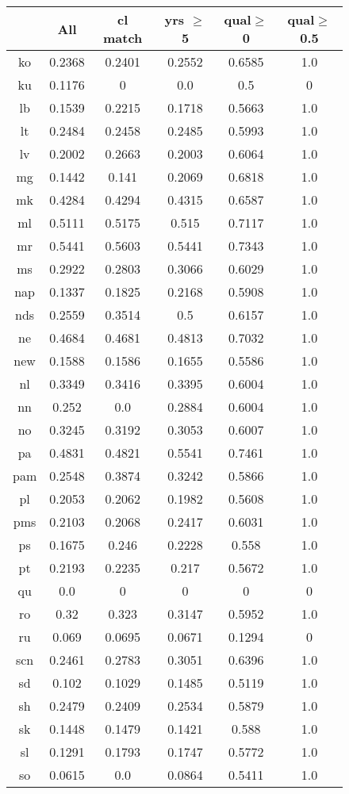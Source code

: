 \begin{figure}[h]
\centering
\begin{tabular}{cccccc}
&All&cl match&yrs $\geq$ 5&qual$\geq$0&qual$\geq$0.5\\
\hline\hline
ko&0.2368&0.2401&0.2552&0.6585&1.0\\
ku&0.1176&0&0.0&0.5&0\\
lb&0.1539&0.2215&0.1718&0.5663&1.0\\
lt&0.2484&0.2458&0.2485&0.5993&1.0\\
lv&0.2002&0.2663&0.2003&0.6064&1.0\\
mg&0.1442&0.141&0.2069&0.6818&1.0\\
mk&0.4284&0.4294&0.4315&0.6587&1.0\\
ml&0.5111&0.5175&0.515&0.7117&1.0\\
mr&0.5441&0.5603&0.5441&0.7343&1.0\\
ms&0.2922&0.2803&0.3066&0.6029&1.0\\
nap&0.1337&0.1825&0.2168&0.5908&1.0\\
nds&0.2559&0.3514&0.5&0.6157&1.0\\
ne&0.4684&0.4681&0.4813&0.7032&1.0\\
new&0.1588&0.1586&0.1655&0.5586&1.0\\
nl&0.3349&0.3416&0.3395&0.6004&1.0\\
nn&0.252&0.0&0.2884&0.6004&1.0\\
no&0.3245&0.3192&0.3053&0.6007&1.0\\
pa&0.4831&0.4821&0.5541&0.7461&1.0\\
pam&0.2548&0.3874&0.3242&0.5866&1.0\\
pl&0.2053&0.2062&0.1982&0.5608&1.0\\
pms&0.2103&0.2068&0.2417&0.6031&1.0\\
ps&0.1675&0.246&0.2228&0.558&1.0\\
pt&0.2193&0.2235&0.217&0.5672&1.0\\
qu&0.0&0&0&0&0\\
ro&0.32&0.323&0.3147&0.5952&1.0\\
ru&0.069&0.0695&0.0671&0.1294&0\\
scn&0.2461&0.2783&0.3051&0.6396&1.0\\
sd&0.102&0.1029&0.1485&0.5119&1.0\\
sh&0.2479&0.2409&0.2534&0.5879&1.0\\
sk&0.1448&0.1479&0.1421&0.588&1.0\\
sl&0.1291&0.1793&0.1747&0.5772&1.0\\
so&0.0615&0.0&0.0864&0.5411&1.0\\

\end{tabular}
\end{figure}

